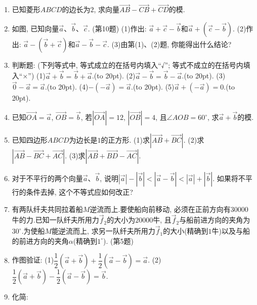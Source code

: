 \documentclass[10pt,a4paper]{article}
\newcommand{\bracket}[1]{(\hbox to #1pt{})}
\begin{document}
\begin{enumerate}[1.]
\item 已知菱形$ABCD$的边长为$2$, 求向量$\overrightarrow{AB}-\overrightarrow{CB}+\overrightarrow{CD}$的模.
\item 如图, 已知向量$\overrightarrow a$、$\overrightarrow b$、$\overrightarrow c$.
(第10题)
(1)作出: $\overrightarrow a+\overrightarrow c-\overrightarrow b$和$\overrightarrow a+(\overrightarrow c-\overrightarrow b)$. (2)作出: $\overrightarrow a-(\overrightarrow b+\overrightarrow c)$和$\overrightarrow a-\overrightarrow b-\overrightarrow c$.
(3)由第(1)、(2)题, 你能得出什么结论?
\item 判断题: (下列等式中, 等式成立的在括号内填入``√''; 等式不成立的在括号内填入``×'')
(1)$\overrightarrow a+\overrightarrow b=\overrightarrow b+\overrightarrow a$.\bracket{20}.
(2)$\overrightarrow a-\overrightarrow b=\overrightarrow b-\overrightarrow a$.\bracket{20}.
(3)$\overrightarrow 0-\overrightarrow a=\overrightarrow a$.\bracket{20}.
(4)$-(-\overrightarrow a)=\overrightarrow a$.\bracket{20}.
(5)$\overrightarrow a+(-\overrightarrow a)=0$.\bracket{20}.
\item 已知$\overrightarrow{OA}=\overrightarrow a$, $\overrightarrow{OB}=\overrightarrow b$, 若$|\overrightarrow{OA}|=12$, $|\overrightarrow{OB}|=4$, 且$\angle AOB=60^{\circ }$, 求$\overrightarrow a+\overrightarrow b$的模.
\item 已知四边形$ABCD$为边长是$1$的正方形.
(1)求$|\overrightarrow{AB}+\overrightarrow{BC}|$. (2)求$|\overrightarrow{AB}-\overrightarrow{BC}+\overrightarrow{AC}|$.
(3)求$|\overrightarrow{AB}+\overrightarrow{BD}-\overrightarrow{AC}|$.
\item 对于不平行的两个向量$\overrightarrow a$、$\overrightarrow b$, 说明$|\overrightarrow a|-|\overrightarrow b|<|\overrightarrow a-\overrightarrow b|<|\overrightarrow a|+|\overrightarrow b|$.
如果将不平行的条件去掉, 这个不等式应如何改正?
\item 有两队纤夫共同拉着船$M$逆流而上.要使船向前移动, 必须在正前方向有$30000$牛的力.已知一队纤夫所用力$\overrightarrow f_2$的大小为$20000$牛, 且$\overrightarrow f_2$与船前进方向的夹角为$30^{\circ }$.为使船$M$能逆流而上, 求另一队纤夫所用力$\overrightarrow f_1$的大小(精确到$1$牛)以及与船的前进方向的夹角$\alpha$(精确到$1^{\circ }$).
(第5题)
\item 作图验证:
(1)$\dfrac 12(\overrightarrow a+\overrightarrow b)+\dfrac 12(\overrightarrow a-\overrightarrow b)=\overrightarrow a$. (2)$\dfrac 12(\overrightarrow a+\overrightarrow b)-\dfrac 12(\overrightarrow a-\overrightarrow b)=\overrightarrow b$.
\item 化简:

\end{enumerate}
\end{document}
